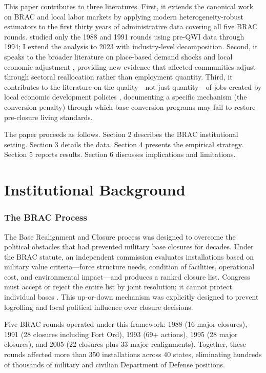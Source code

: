\documentclass[12pt]{article}
\begin{document}
This paper contributes to three literatures. First, it extends the canonical work on BRAC and local labor markets \citep{hooker2001, poppert2003, gao2005} by applying modern heterogeneity-robust estimators to the first thirty years of administrative data covering all five BRAC rounds. \citet{hooker2001} studied only the 1988 and 1991 rounds using pre-QWI data through 1994; I extend the analysis to 2023 with industry-level decomposition. Second, it speaks to the broader literature on place-based demand shocks and local economic adjustment \citep{blanchard1992, bound2000, notowidigdo2020, autor2013, yagan2019}, providing new evidence that affected communities adjust through sectoral reallocation rather than employment quantity. Third, it contributes to the literature on the quality---not just quantity---of jobs created by local economic development policies \citep{bartik2019, kline2014, greenstone2010}, documenting a specific mechanism (the conversion penalty) through which base conversion programs may fail to restore pre-closure living standards.

The paper proceeds as follows. Section 2 describes the BRAC institutional setting. Section 3 details the data. Section 4 presents the empirical strategy. Section 5 reports results. Section 6 discusses implications and limitations.

\section{Institutional Background}

\subsubsection*{The BRAC Process} The Base Realignment and Closure process was designed to overcome the political obstacles that had prevented military base closures for decades. Under the BRAC statute, an independent commission evaluates installations based on military value criteria---force structure needs, condition of facilities, operational cost, and environmental impact---and produces a ranked closure list. Congress must accept or reject the entire list by joint resolution; it cannot protect individual bases \citep{sorenson2007}. This up-or-down mechanism was explicitly designed to prevent logrolling and local political influence over closure decisions.

Five BRAC rounds operated under this framework: 1988 (16 major closures), 1991 (28 closures including Fort Ord), 1993 (69+ actions), 1995 (28 major closures), and 2005 (22 closures plus 33 major realignments). Together, these rounds affected more than 350 installations across 40 states, eliminating hundreds of thousands of military and civilian Department of Defense positions.
\end{document}
